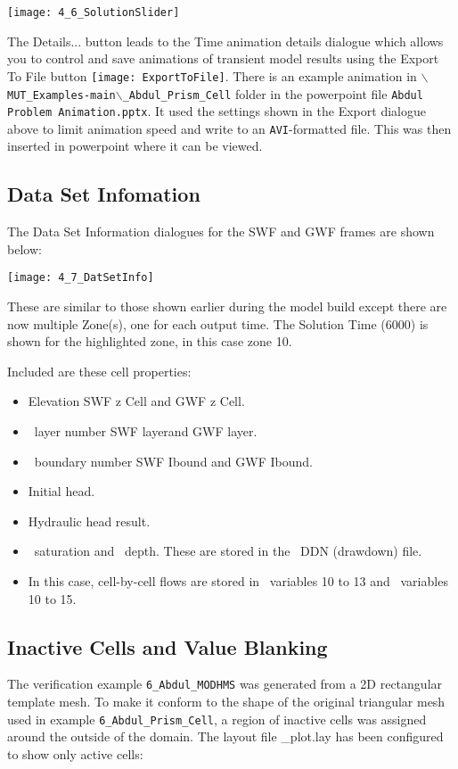         \texttt{[image: 4\_6\_SolutionSlider]}

The {\sf Details...} button leads to the {\sf Time animation details} dialogue which allows you to control and save animations of transient model results using the {\sf Export To File} button \texttt{[image: ExportToFile]}.  There is an example animation in  \texttt{$\backslash$MUT\_Examples-main$\backslash$\_Abdul\_Prism\_Cell} folder in the powerpoint file {\tt Abdul Problem Animation.pptx}.  It used the settings shown in the {\sf Export} dialogue above to limit animation speed and write to an {\tt AVI}-formatted file.  This was then inserted in powerpoint where it can be viewed.

\subsection{Data Set Infomation}
The {\sf Data Set Information} dialogues for the {\sf SWF} and {\sf GWF} frames are shown below:

        \texttt{[image: 4\_7\_DatSetInfo]}

These are similar to those shown earlier during the model build except there are now multiple {\sf Zone(s)}, one for each output time.  The {\sf Solution Time} (6000) is shown for the highlighted zone, in this case zone 10.

Included are these cell properties:
\begin{itemize}
    \item Elevation {\sf SWF z Cell} and {\sf GWF z Cell}.
    \item \mf\ layer number  {\sf SWF layer}and {\sf GWF layer}.
    \item \mf\ boundary number {\sf SWF Ibound} and {\sf GWF Ibound}.
    \item Initial head.
    \item Hydraulic head result.
    \item \gwf\ saturation and \swf\ depth.  These are stored in the \mf\ DDN (drawdown) file.
    \item In this case, cell-by-cell flows are stored in \gwf\ variables 10 to 13 and \swf\ variables 10 to 15.
\end{itemize}

\subsection{Inactive Cells and Value Blanking }
The verification example {\tt 6\_Abdul\_MODHMS} was generated from a 2D rectangular template mesh.  To make it conform to the shape of the original triangular mesh used in example  {\tt 6\_Abdul\_Prism\_Cell}, a region of inactive cells was assigned around the outside of the domain.  The layout file {\sf \_plot.lay} has been configured to show only active cells:

